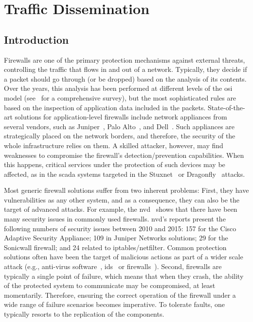 \chapter{Traffic Dissemination}
\label{chap:sieveq}

\section{Introduction}

Firewalls are one of the primary protection mechanisms against external threats, controlling the traffic that flows in and out of a network. 
Typically, they decide if a packet should go through (or be dropped) based on the analysis of its contents. 
Over the years, this analysis has been performed at different levels of the \gls{osi} model (see~\cite{Keromytis:2006} for a comprehensive survey), but the most sophisticated rules are based on the inspection of application data included in the packets.
State-of-the-art solutions for application-level firewalls include network appliances from several vendors, such as Juniper~\cite{juniper}, Palo Alto~\cite{paloalto}, and Dell~\cite{sonicwall}.
Such appliances are strategically placed on the network borders, and therefore, the security of the whole infrastructure relies on them.
A skilled attacker, however, may find weaknesses to compromise the firewall's detection/prevention capabilities.
When this happens, critical services under the protection of such devices may be affected, as in the \gls{scada} systems targeted in the Stuxnet~\cite{stuxnet:2010} or Dragonfly~\cite{dragonfly:2014} attacks.


Most generic firewall solutions suffer from two inherent problems: 
First, they have vulnerabilities as any other system, and as a consequence, they can also be the target of advanced attacks. 
For example, the \gls{nvd}~\cite{nvd} shows that there have been many security issues in commonly used firewalls. 
\gls{nvd}'s reports present the following numbers of security issues between 2010 and 2015: 157 for the Cisco Adaptive Security Appliance; 109 in Juniper Networks solutions; 29 for the Sonicwall firewall; and 24 related to iptables/netfilter. 
Common protection solutions often have been the target of malicious actions as part of a wider scale attack (e.g., anti-virus software~\cite{Chauhan:2011}, \gls{ids}~\cite{Anderson:2001} or firewalls~\cite{Kamara:2003,Surisetty:2010,cisco1,cisco2}).
Second, firewalls are typically a single point of failure, which means that when they crash, the ability of the protected system to communicate may be compromised, at least momentarily.
Therefore, ensuring the correct operation of the firewall under a wide range of failure scenarios becomes imperative.
To tolerate faults, one typically resorts to the replication of the components.

